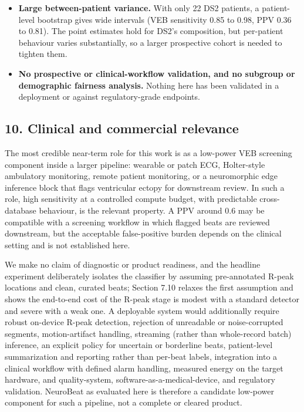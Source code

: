 \documentclass[
]{article}
\begin{document}
\begin{itemize}
  \textbf{Single lead.} Results use one lead; SVEB in particular appears
  to need more lead information.
\item
  \textbf{Large between-patient variance.} With only 22 DS2 patients, a
  patient-level bootstrap gives wide intervals (VEB sensitivity 0.85 to
  0.98, PPV 0.36 to 0.81). The point estimates hold for DS2's
  composition, but per-patient behaviour varies substantially, so a
  larger prospective cohort is needed to tighten them.
\item
  \textbf{No prospective or clinical-workflow validation, and no
  subgroup or demographic fairness analysis.} Nothing here has been
  validated in a deployment or against regulatory-grade endpoints.
\end{itemize}

\subsection{10. Clinical and commercial
relevance}\label{clinical-and-commercial-relevance}

The most credible near-term role for this work is as a low-power VEB
screening component inside a larger pipeline: wearable or patch ECG,
Holter-style ambulatory monitoring, remote patient monitoring, or a
neuromorphic edge inference block that flags ventricular ectopy for
downstream review. In such a role, high sensitivity at a controlled
compute budget, with predictable cross-database behaviour, is the
relevant property. A PPV around 0.6 may be compatible with a screening
workflow in which flagged beats are reviewed downstream, but the
acceptable false-positive burden depends on the clinical setting and is
not established here.

We make no claim of diagnostic or product readiness, and the headline
experiment deliberately isolates the classifier by assuming
pre-annotated R-peak locations and clean, curated beats; Section 7.10
relaxes the first assumption and shows the end-to-end cost of the R-peak
stage is modest with a standard detector and severe with a weak one. A
deployable system would additionally require robust on-device R-peak
detection, rejection of unreadable or noise-corrupted segments,
motion-artifact handling, streaming (rather than whole-record batch)
inference, an explicit policy for uncertain or borderline beats,
patient-level summarization and reporting rather than per-beat labels,
integration into a clinical workflow with defined alarm handling,
measured energy on the target hardware, and quality-system,
software-as-a-medical-device, and regulatory validation. NeuroBeat as
evaluated here is therefore a candidate low-power component for such a
pipeline, not a complete or cleared product.
\end{document}
